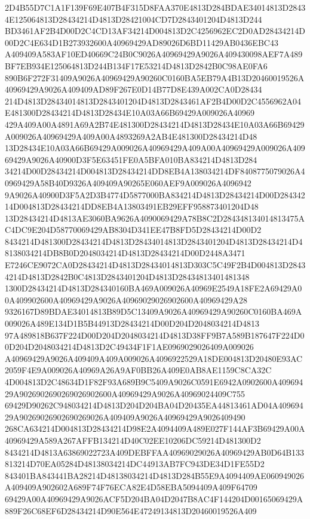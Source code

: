 \documentclass[UTF8,fontset=fandol,zihao=-4,a4paper]{ctexart}
\begin{document}
{{2D4B55D7C1A1F139F69E407B4F315D8FAA370E4813D284BDAE34014813D28434E125064813D28434214D4813D28421004CD7D2843401204D4813D244
BD3461AF2B4D00D2C4CD13AF34214D004813D2C4256962EC2D0AD28434214D00D2C4E634D1B273932600A40969429AD89026D6BD11429AB0436EBC43
A409409A583AF10ED40669C24B0C9026A40969429A9026A409430098AEF7A489BF7EB934E125064813D244B134F17E53214D4813D2842B0C98AE0FA6
890B6F272F31409A9026A40969429A90260C0160BA5EB79A4B13D20460019526A40969429A9026A409409AD89F267E0D14B77D8E439A002CA0D28434
214D4813D28434014813D2843401204D4813D2843461AF2B4D00D2C4556962A04E481300D28434214D4813D28434E10A03A66B69429A009026A40969
429A409A00A4891A69A2B74E481300D28434214D4813D28434E10A03A66B69429A009026A40969429A409A00A4893269A2AB4E481300D28434214D48
13D28434E10A03A66B69429A009026A40969429A409A00A40969429A009026A40969429A9026A40900D3F5E63451FE0A5BFA010BA834214D4813D284
34214D00D28434214D004813D28434214DD8EB4A138034214DF8408775079026A40969429A58B40D9326A409409A90265E060AEF9A009026A4096942
9A9026A40900D3F5A2D3B4774D5877000BA834214D4813D28434214D00D28434214D004813D28434214DD8EB4A13803491EB29EFF958873401204D48
13D28434214D4813AE3060BA9626A4090069429A78B8C2D284348134014813475AC4DC9E204D58770069429AB8304D341EE47B8FD5D28434214D00D2
8434214D481300D28434214D4813D28434014813D2843401204D4813D28434214D48138034214DB8B0D2048034214D4813D28434214D00D2448A3471
E7246CE9072CA0D28434214D4813D28434014813D303C5C49F2B4D004813D28434214D4813D2842B0C4813D2843401204D4813D28434813401481348
1300D28434214D4813D284340160BA469A009026A40969E2549A18FE2A69429A00A409902600A40969429A9026A40969029026902600A40969429A28
9326167D89BDAE34014813B89D5C13409A9026A40969429A90260C0160BA469A009026A489E134D1B5B44913D28434214D00D204D2048034214D4813
97A489818B637F224D00D204D2048034214D4813D38FF9B7A589B187647F224D00D204D2048034214D4813D2C49434F1F1AE0969029026409A009026
A40969429A9026A409409A409A009026A4096922529A18DE004813D20480E93AC2059F4E9A009026A40969A26A9AF0BB26A409E0AB8AE1159C8CA32C
4D004813D2C48634D1F82F93A689B9C5409A9026C0591E6942A0902600A40969429A9026902690269026902600A40969429A9026A40969024409C755
69429D90262C948034214D4813D204D204BA04D20435EA44813461AD04A40969429A90269026902690269026A409409A9026A40969429A9026409490
268CA634214D004813D28434214D98E2A4094409A489E027F144AF3B69429A00A40969429A589A267AFFB134214D40C02EE10206DC59214D481300D2
8434214D4813A63869022723A409DEBFFAA40969029026A40969429AB0D64B133813214D70EA05284D48138034214DC44913AB7FC943DE34D1FE55D2
843401BA843441BA28214D48138034214D4813D284B55E9A4094409AE060949026A409409A902602A689F74F76ECA82E4D58EBA5094409A409F64709
69429A00A40969429A9026ACF5D204BA04D2047B8AC4F144204D00165069429A889F26C68EF6D28434214D90E564E47249134813D20460019526A409
}}
\end{document}
